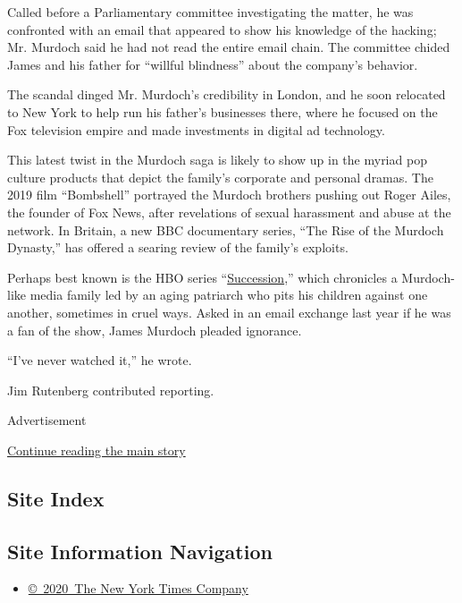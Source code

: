 Called before a Parliamentary committee investigating the matter, he was
confronted with an email that appeared to show his knowledge of the
hacking; Mr. Murdoch said he had not read the entire email chain. The
committee chided James and his father for ``willful blindness'' about
the company's behavior.

The scandal dinged Mr. Murdoch's credibility in London, and he soon
relocated to New York to help run his father's businesses there, where
he focused on the Fox television empire and made investments in digital
ad technology.

This latest twist in the Murdoch saga is likely to show up in the myriad
pop culture products that depict the family's corporate and personal
dramas. The 2019 film ``Bombshell'' portrayed the Murdoch brothers
pushing out Roger Ailes, the founder of Fox News, after revelations of
sexual harassment and abuse at the network. In Britain, a new BBC
documentary series, ``The Rise of the Murdoch Dynasty,'' has offered a
searing review of the family's exploits.

Perhaps best known is the HBO series
``\href{https://www.nytimes.com/2019/08/04/business/media/hbo-succession-business.html}{Succession},''
which chronicles a Murdoch-like media family led by an aging patriarch
who pits his children against one another, sometimes in cruel ways.
Asked in an email exchange last year if he was a fan of the show, James
Murdoch pleaded ignorance.

``I've never watched it,'' he wrote.

Jim Rutenberg contributed reporting.

Advertisement

\protect\hyperlink{after-bottom}{Continue reading the main story}

\hypertarget{site-index}{%
\subsection{Site Index}\label{site-index}}

\hypertarget{site-information-navigation}{%
\subsection{Site Information
Navigation}\label{site-information-navigation}}

\begin{itemize}
\tightlist
\item
  \href{https://help.nytimes.com/hc/en-us/articles/115014792127-Copyright-notice}{©~2020~The
  New York Times Company}
\end{itemize}

